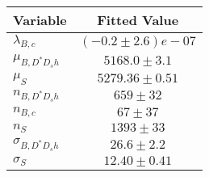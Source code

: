 \begin{tabular}[t]{lc}
\hline
Variable &Fitted Value\\
\hline\hline
$\lambda_{B,c}$&$(-0.2\pm2.6)e-07$\\
\hline
$\mu_{B, D^* D_s h}$&$5168.0\pm3.1$\\
\hline
$\mu_S$&$5279.36\pm0.51$\\
\hline
$n_{B, D^* D_s h}$&$659\pm32$\\
\hline
$n_{B,c}$&$67\pm37$\\
\hline
$n_S$&$1393\pm33$\\
\hline
$\sigma_{B, D^* D_s h}$&$26.6\pm2.2$\\
\hline
$\sigma_S$&$12.40\pm0.41$\\
\hline
\end{tabular}